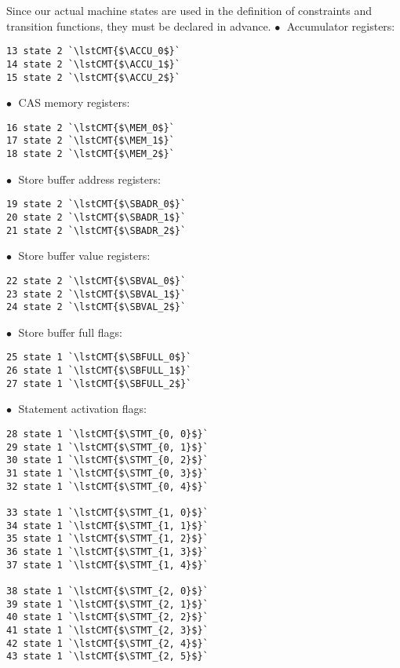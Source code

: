 \noindent
Since our actual machine states are used in the definition of constraints and transition functions, they must be declared in advance.
\bigbreak
\noindent
$\bullet \;$ Accumulator registers: %
\begin{lstlisting}[style=btor2]
13 state 2 `\lstCMT{$\ACCU_0$}`
14 state 2 `\lstCMT{$\ACCU_1$}`
15 state 2 `\lstCMT{$\ACCU_2$}`
\end{lstlisting}

\noindent
$\bullet \;$ CAS memory registers: %
\begin{lstlisting}[style=btor2]
16 state 2 `\lstCMT{$\MEM_0$}`
17 state 2 `\lstCMT{$\MEM_1$}`
18 state 2 `\lstCMT{$\MEM_2$}`
\end{lstlisting}

\noindent
$\bullet \;$ Store buffer address registers: %
\begin{lstlisting}[style=btor2]
19 state 2 `\lstCMT{$\SBADR_0$}`
20 state 2 `\lstCMT{$\SBADR_1$}`
21 state 2 `\lstCMT{$\SBADR_2$}`
\end{lstlisting}

\noindent
$\bullet \;$ Store buffer value registers: %
\begin{lstlisting}[style=btor2]
22 state 2 `\lstCMT{$\SBVAL_0$}`
23 state 2 `\lstCMT{$\SBVAL_1$}`
24 state 2 `\lstCMT{$\SBVAL_2$}`
\end{lstlisting}

\noindent
$\bullet \;$ Store buffer full flags: %
\begin{lstlisting}[style=btor2]
25 state 1 `\lstCMT{$\SBFULL_0$}`
26 state 1 `\lstCMT{$\SBFULL_1$}`
27 state 1 `\lstCMT{$\SBFULL_2$}`
\end{lstlisting}

\noindent
$\bullet \;$ Statement activation flags: %
\begin{lstlisting}[style=btor2]
28 state 1 `\lstCMT{$\STMT_{0, 0}$}`
29 state 1 `\lstCMT{$\STMT_{0, 1}$}`
30 state 1 `\lstCMT{$\STMT_{0, 2}$}`
31 state 1 `\lstCMT{$\STMT_{0, 3}$}`
32 state 1 `\lstCMT{$\STMT_{0, 4}$}`

33 state 1 `\lstCMT{$\STMT_{1, 0}$}`
34 state 1 `\lstCMT{$\STMT_{1, 1}$}`
35 state 1 `\lstCMT{$\STMT_{1, 2}$}`
36 state 1 `\lstCMT{$\STMT_{1, 3}$}`
37 state 1 `\lstCMT{$\STMT_{1, 4}$}`

38 state 1 `\lstCMT{$\STMT_{2, 0}$}`
39 state 1 `\lstCMT{$\STMT_{2, 1}$}`
40 state 1 `\lstCMT{$\STMT_{2, 2}$}`
41 state 1 `\lstCMT{$\STMT_{2, 3}$}`
42 state 1 `\lstCMT{$\STMT_{2, 4}$}`
43 state 1 `\lstCMT{$\STMT_{2, 5}$}`
\end{lstlisting}

